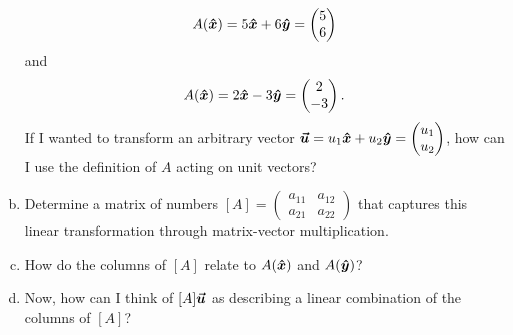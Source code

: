 \documentclass[12pt]{article} %
\begin{document}
\begin{problem}
\begin{enumerate}[(a)]
        \[
            A(\boldsymbol{\hat{x}}) = 5 \boldsymbol{\hat{x}} + 6\boldsymbol{\hat{y}} = \begin{pmatrix} 5 \\ 6 \end{pmatrix}
        \]
        and
        \[
            A(\boldsymbol{\hat{x}}) = 2 \boldsymbol{\hat{x}} - 3 \boldsymbol{\hat{y}} = \begin{pmatrix} 2 \\ -3 \end{pmatrix}.
        \]
        If I wanted to transform an arbitrary vector $\boldsymbol{\boldsymbol{\vec{u}}} = u_1 \boldsymbol{\hat{x}} + u_2 \boldsymbol{\hat{y}} = \begin{pmatrix} u_1 \\ u_2 \end{pmatrix}$, how can I use the definition of $A$ acting on unit vectors?
        \item Determine a matrix of numbers $[A] = \begin{pmatrix} a_{11} & a_{12} \\ a_{21} & a_{22} \end{pmatrix}$ that captures this linear transformation through matrix-vector multiplication. 
        \item How do the columns of $[A]$ relate to $A(\boldsymbol{\hat{x}})$ and $A(\boldsymbol{\hat{y}})$?
        \item Now, how can I think of $[A]\boldsymbol{\boldsymbol{\vec{u}}}$ as describing a linear combination of the columns of $[A]$?
    \end{enumerate}
\end{problem}
\end{document}
